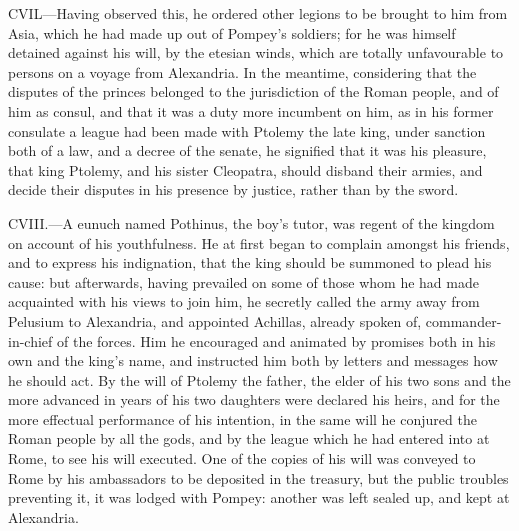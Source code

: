 CVIL—Having observed this, he ordered other legions to be brought to
him from Asia, which he had made up out of Pompey's soldiers; for he was
himself detained against his will, by the etesian winds, which are
totally unfavourable to persons on a voyage from Alexandria. In the
meantime, considering that the disputes of the princes belonged to the
jurisdiction of the Roman people, and of him as consul, and that it was
a duty more incumbent on him, as in his former consulate a league had
been made with Ptolemy the late king, under sanction both of a law, and
a decree of the senate, he signified that it was his pleasure, that king
Ptolemy, and his sister Cleopatra, should disband their armies, and
decide their disputes in his presence by justice, rather than by the
sword.

CVIII.—A eunuch named Pothinus, the boy's tutor, was regent of the
kingdom on account of his youthfulness. He at first began to complain
amongst his friends, and to express his indignation, that the king
should be summoned to plead his cause: but afterwards, having prevailed
on some of those whom he had made acquainted with his views to join him,
he secretly called the army away from Pelusium to Alexandria, and
appointed Achillas, already spoken of, commander-in-chief of the forces.
Him he encouraged and animated by promises both in his own and the
king's name, and instructed him both by letters and messages how he
should act. By the will of Ptolemy the father, the elder of his two sons
and the more advanced in years of his two daughters were declared his
heirs, and for the more effectual performance of his intention, in the
same will he conjured the Roman people by all the gods, and by the
league which he had entered into at Rome, to see his will executed. One
of the copies of his will was conveyed to Rome by his ambassadors to be
deposited in the treasury, but the public troubles preventing it, it was
lodged with Pompey: another was left sealed up, and kept at Alexandria.

